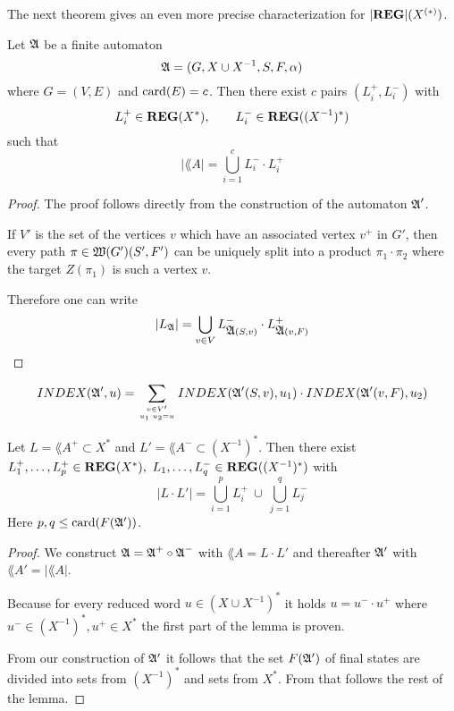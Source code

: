 The next theorem gives an even more precise characterization for
$|\mbox{{\bf REG}}|(\mbox{${X}^{(*)}$})$.

\begin{theorem}
Let $\mbox{$\mathfrak{A}$}$ be a finite automaton
\[ \mbox{$\mathfrak{A}$} = (G, X \cup {X}^{-1}, S, F, \alpha) \]
where $G = (V, E)$ and $\mathrm{card}(E) = c$. Then there exist $c$ pairs $(L_i^+,
L_i^-)$ with 
\[ L_i^+ \in \mbox{{\bf REG}}(X^*),\qquad L_i^- \in \mbox{{\bf REG}}((X^{-1})^*) \]
such that
\[ |\lang{A}| = \bigcup_{i=1}^c L_i^- \cdot L_i^+ \]
\end{theorem}

\begin{proof}
The proof follows directly from the construction of the automaton $\mbox{$\mathfrak{A}$}'$.

If $V'$ is the set of the vertices $v$ which have an associated vertex $v^+$ in
$G'$, then every path $\pi \in \mbox{$\mathfrak{W}(G')$}(S', F')$ can be uniquely split into
a product $\pi_1 \cdot \pi_2$ where the target $Z(\pi_1)$ is such a vertex $v$.

Therefore one can write
\[ |\mbox{$L_{\mathfrak{A}}$}| = \bigcup_{v \in V} L_{\mbox{$\mathfrak{A}$}(S, v)}^- \cdot L_{\mbox{$\mathfrak{A}$}(v, F)}^+
\]
\end{proof}

\begin{corollary}
\[ INDEX(\mbox{$\mathfrak{A}$}', u) = \sum_{v \in V' \atop u_1 \cdot u_2 = u}
INDEX(\mbox{$\mathfrak{A}$}'(S, v), u_1) \cdot INDEX(\mbox{$\mathfrak{A}$}'(v, F), u_2) \]
\end{corollary}

\begin{lemma}
Let $L = \lang{A}^+ \subset X^*$ and $L' = \lang{A}^- \subset (X^{-1})^*$. Then
there exist $L_1^+,\ldots,L_p^+ \in \mbox{{\bf REG}}(X^*),\ L_1,\ldots,L_q^- \in
\mbox{{\bf REG}}((X^{-1})^*)$ with
\[ |L \cdot L'| = \bigcup_{i=1}^{p} L_i^+ \ \cup\ \bigcup_{j=1}^{q} L_j^- \]
Here $p, q \leq \mathrm{card}(F(\mbox{$\mathfrak{A'}$}))$.
\end{lemma}

\begin{proof}
We construct $\mbox{$\mathfrak{A}$} = \mbox{$\mathfrak{A}$}^+ \circ \mbox{$\mathfrak{A}$}^-$ with $\lang{A} = L \cdot L'$ and
thereafter $\mbox{$\mathfrak{A'}$}$ with $\lang{A'} = |\lang{A}|$.

Because for every reduced word $u \in (X\cup X^{-1})^*$ it holds $u = u^- \cdot
u^+$ where $u^- \in (X^{-1})^*, u^+ \in X^*$ the first part of the lemma is
proven.

From our construction of $\mbox{$\mathfrak{A'}$}$ it follows that the set $F(\mbox{$\mathfrak{A'}$})$ of final
states are divided into sets from $(X^{-1})^*$ and sets from $X^*$. From that
follows the rest of the lemma.
\end{proof}

